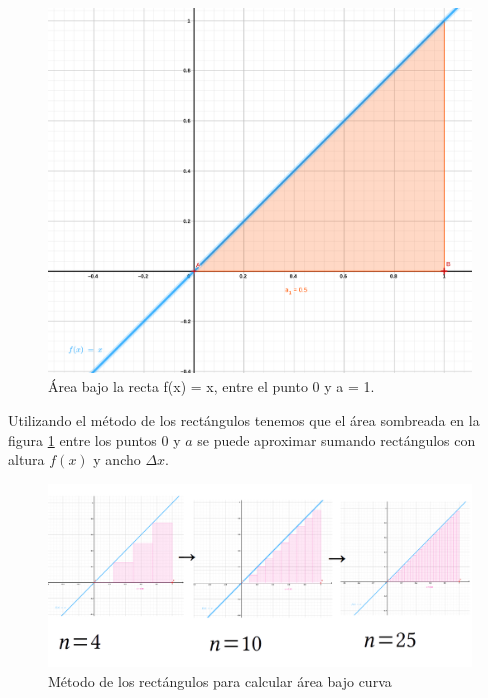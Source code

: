 \documentclass[
]{book}
\begin{document}
\begin{figure}

{\centering \includegraphics[width=25.43in]{Unidad-III/Area-bajo-recta} 

}

\caption{Área bajo la recta f(x) = x, entre el punto 0 y a = 1.}\label{fig:Area-recta}
\end{figure}

Utilizando el método de los rectángulos tenemos que el área sombreada en la figura \ref{fig:Area-recta} entre los puntos \(0\) y \(a\) se puede aproximar sumando rectángulos con altura \(f(x)\) y ancho \(\Delta x\).

\begin{figure}

{\centering \includegraphics[width=16.04in]{Unidad-III/Rectangulos} 

}

\caption{Método de los rectángulos para calcular área bajo curva}\label{fig:Recta-area-rect}
\end{figure}
\end{document}
